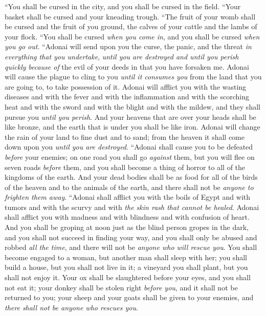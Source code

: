 \begin{biblechapter}
\verse “You shall be cursed in the city, and you shall be cursed in the field.
\verse “Your basket shall be cursed and your kneading trough.
\verse “The fruit of your womb shall be cursed and the fruit of you ground, the calves of your cattle and the lambs of your flock.
\verse “You shall be cursed \textit{when you come in}, and you shall be cursed \textit{when you go out}.
\verse “Adonai will send upon you the curse, the panic, and the threat \textit{in everything that you undertake}, \textit{until you are destroyed and until you perish quickly} \textit{because of} the evil of your deeds in that you have forsaken me.
\verse Adonai will cause the plague to cling to you \textit{until it consumes you} from the land that you are going to, to take possession of it.
\verse Adonai will afflict you with the wasting diseases and with the fever and with the inflammation and with the scorching heat and with the sword and with the blight and with the mildew, and they shall pursue you \textit{until you perish}.
\verse And your heavens that are over your heads shall be like bronze, and the earth that is under you shall be like iron.
\verse Adonai will change the rain of your land to fine dust and to sand; from the heaven it shall come down upon you \textit{until you are destroyed}.
\verse “Adonai shall cause you to be defeated \textit{before} your enemies; on one road you shall go \textit{against} them, but you will flee on seven roads \textit{before} them, and you shall become a thing of horror to all of the kingdoms of the earth.
\verse And your dead bodies shall be as food for all of the birds of the heaven and to the animals of the earth, and there shall not be \textit{anyone to frighten them away}.
\verse “Adonai shall afflict you with the boils of Egypt and with tumors and with the scurvy and with \textit{the skin rash that cannot be healed}.
\verse Adonai shall afflict you with madness and with blindness and with confusion of heart.
\verse And you shall be groping at noon just as the blind person gropes in the dark, and you shall not succeed in finding your way, and you shall only be abused and robbed \textit{all the time}, and there will not be \textit{anyone who will rescue you}. 
\verse You shall become engaged to a woman, but another man shall sleep with her; you shall build a house, but you shall not live in it; a vineyard you shall plant, but you shall not enjoy it.
\verse Your ox shall be slaughtered before your eyes, and you shall not eat it; your donkey shall be stolen right \textit{before you}, and it shall not be returned to you; your sheep and your goats shall be given to your enemies, and \textit{there shall not be anyone who rescues you}.

\end{biblechapter}
